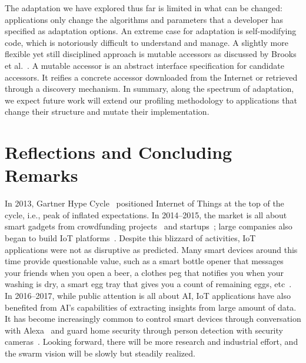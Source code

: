 \documentclass[thesis.tex]{subfiles}
\begin{document}
 The adaptation we have explored thus far is
limited in what can be changed: applications only change the algorithms and
parameters that a developer has specified as adaptation options. An extreme case
for adaptation is self-modifying code, which is notoriously difficult to
understand and manage. A slightly more flexible yet still disciplined approach
is mutable accessors as discussed by Brooks et al.~\cite{brooks2018component}. A
mutable accessor is an abstract interface specification for candidate
accessors. It reifies a concrete accessor downloaded from the Internet or
retrieved through a discovery mechanism. In summary, along the spectrum of
adaptation, we expect future work will extend our profiling methodology to
applications that change their structure and mutate their implementation.

\section{Reflections and Concluding Remarks}
\label{sec:conclusions}

In 2013, Gartner Hype Cycle~\cite{middleton2013forecast} positioned Internet of
Things at the top of the cycle, i.e., peak of inflated expectations. In
2014--2015, the market is all about smart gadgets from crowdfunding
projects~\cite{kickstarter} and startups~\cite{fitbit}; large companies also
began to build IoT platforms~\cite{sami, awsiot}. Despite this blizzard of
activities, IoT applications were not as disruptive as predicted. Many smart
devices around this time provide questionable value, such as a smart bottle
opener that messages your friends when you open a beer, a clothes peg that
notifies you when your washing is dry, a smart egg tray that gives you a count
of remaining eggs, etc~\cite{hartmann2016societal}. In 2016--2017, while public
attention is all about AI, IoT applications have also benefited from AI's
capabilities of extracting insights from large amount of data. It has become
increasingly common to control smart devices through conversation with
Alexa~\cite{alexa} and guard home security through person detection with
security cameras~\cite{dropcam}. Looking forward, there will be more research
and industrial effort, and the swarm vision will be slowly but steadily
realized.
\end{document}
